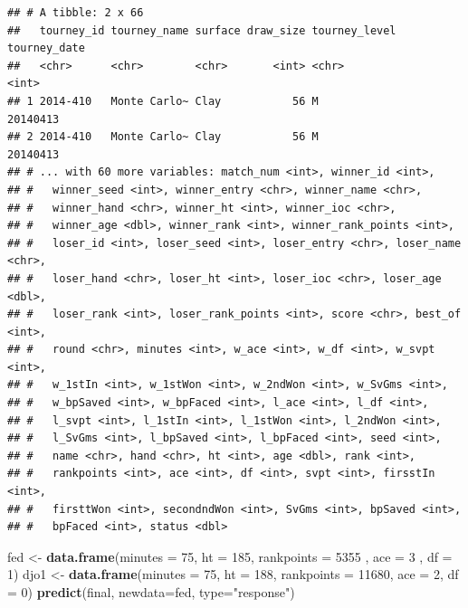\documentclass[]{article}
\newenvironment{Shaded}{\begin{snugshade}}{\end{snugshade}}
\newcommand{\DataTypeTok}[1]{\textcolor[rgb]{0.13,0.29,0.53}{#1}}
\newcommand{\DecValTok}[1]{\textcolor[rgb]{0.00,0.00,0.81}{#1}}
\newcommand{\KeywordTok}[1]{\textcolor[rgb]{0.13,0.29,0.53}{\textbf{#1}}}
\newcommand{\NormalTok}[1]{#1}
\newcommand{\OperatorTok}[1]{\textcolor[rgb]{0.81,0.36,0.00}{\textbf{#1}}}
\newcommand{\StringTok}[1]{\textcolor[rgb]{0.31,0.60,0.02}{#1}}
\begin{document}
\begin{Shaded}
\end{Shaded}

\begin{verbatim}
## # A tibble: 2 x 66
##   tourney_id tourney_name surface draw_size tourney_level tourney_date
##   <chr>      <chr>        <chr>       <int> <chr>                <int>
## 1 2014-410   Monte Carlo~ Clay           56 M                 20140413
## 2 2014-410   Monte Carlo~ Clay           56 M                 20140413
## # ... with 60 more variables: match_num <int>, winner_id <int>,
## #   winner_seed <int>, winner_entry <chr>, winner_name <chr>,
## #   winner_hand <chr>, winner_ht <int>, winner_ioc <chr>,
## #   winner_age <dbl>, winner_rank <int>, winner_rank_points <int>,
## #   loser_id <int>, loser_seed <int>, loser_entry <chr>, loser_name <chr>,
## #   loser_hand <chr>, loser_ht <int>, loser_ioc <chr>, loser_age <dbl>,
## #   loser_rank <int>, loser_rank_points <int>, score <chr>, best_of <int>,
## #   round <chr>, minutes <int>, w_ace <int>, w_df <int>, w_svpt <int>,
## #   w_1stIn <int>, w_1stWon <int>, w_2ndWon <int>, w_SvGms <int>,
## #   w_bpSaved <int>, w_bpFaced <int>, l_ace <int>, l_df <int>,
## #   l_svpt <int>, l_1stIn <int>, l_1stWon <int>, l_2ndWon <int>,
## #   l_SvGms <int>, l_bpSaved <int>, l_bpFaced <int>, seed <int>,
## #   name <chr>, hand <chr>, ht <int>, age <dbl>, rank <int>,
## #   rankpoints <int>, ace <int>, df <int>, svpt <int>, firsstIn <int>,
## #   firsttWon <int>, secondndWon <int>, SvGms <int>, bpSaved <int>,
## #   bpFaced <int>, status <dbl>
\end{verbatim}

\begin{Shaded}
\begin{Highlighting}[]
\NormalTok{fed <-}\StringTok{ }\KeywordTok{data.frame}\NormalTok{(}\DataTypeTok{minutes =} \DecValTok{75}\NormalTok{, }\DataTypeTok{ht =} \DecValTok{185}\NormalTok{, }\DataTypeTok{rankpoints =} \DecValTok{5355}\NormalTok{ , }\DataTypeTok{ace =} \DecValTok{3}\NormalTok{ , }\DataTypeTok{df =} \DecValTok{1}\NormalTok{)}
\NormalTok{djo1 <-}\StringTok{ }\KeywordTok{data.frame}\NormalTok{(}\DataTypeTok{minutes =} \DecValTok{75}\NormalTok{, }\DataTypeTok{ht =} \DecValTok{188}\NormalTok{, }\DataTypeTok{rankpoints =} \DecValTok{11680}\NormalTok{, }\DataTypeTok{ace =} \DecValTok{2}\NormalTok{, }\DataTypeTok{df =} \DecValTok{0}\NormalTok{)}
\KeywordTok{predict}\NormalTok{(final, }\DataTypeTok{newdata=}\NormalTok{fed, }\DataTypeTok{type=}\StringTok{"response"}\NormalTok{)}
\end{Highlighting}
\end{Shaded}
\end{document}
